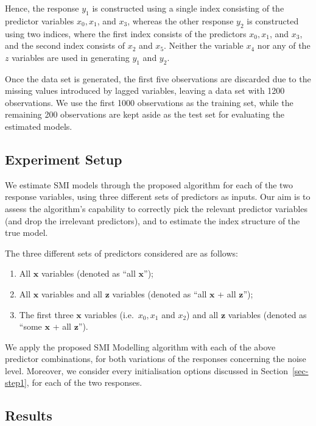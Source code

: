 \documentclass[
  11pt,
  a4paper,
]{article}
\providecommand{\tightlist}{%
  \setlength{\itemsep}{0pt}\setlength{\parskip}{0pt}}\usepackage{longtable,booktabs,array}
\begin{document}
Hence, the response \(y_{1}\) is constructed using a single index
consisting of the predictor variables \(x_{0}, x_{1}\), and \(x_{3}\),
whereas the other response \(y_{2}\) is constructed using two indices,
where the first index consists of the predictors \(x_{0}, x_{1}\), and
\(x_{3}\), and the second index consists of \(x_{2}\) and \(x_{5}\).
Neither the variable \(x_{4}\) nor any of the \(z\) variables are used
in generating \(y_{1}\) and \(y_{2}\).

Once the data set is generated, the first five observations are
discarded due to the missing values introduced by lagged variables,
leaving a data set with 1200 observations. We use the first 1000
observations as the training set, while the remaining 200 observations
are kept aside as the test set for evaluating the estimated models.

\subsection{Experiment Setup}\label{sec-exp}

We estimate SMI models through the proposed algorithm for each of the
two response variables, using three different sets of predictors as
inputs. Our aim is to assess the algorithm's capability to correctly
pick the relevant predictor variables (and drop the irrelevant
predictors), and to estimate the index structure of the true model.

The three different sets of predictors considered are as follows:

\begin{enumerate}
\def\labelenumi{\arabic{enumi}.}
\tightlist
\item
  All \(\bm{x}\) variables (denoted as ``all \(\bm{x}\)'');
\item
  All \(\bm{x}\) variables and all \(\bm{z}\) variables (denoted as
  ``all \(\bm{x}\) + all \(\bm{z}\)'');
\item
  The first three \(\bm{x}\) variables (i.e.~\(x_{0}, x_{1}\) and
  \(x_{2}\)) and all \(\bm{z}\) variables (denoted as ``some \(\bm{x}\)
  + all \(\bm{z}\)'').
\end{enumerate}

We apply the proposed SMI Modelling algorithm with each of the above
predictor combinations, for both variations of the responses concerning
the noise level. Moreover, we consider every initialisation options
discussed in Section~\ref{sec-step1}, for each of the two responses.

\subsection{Results}\label{sec-sim-results}
\end{document}
